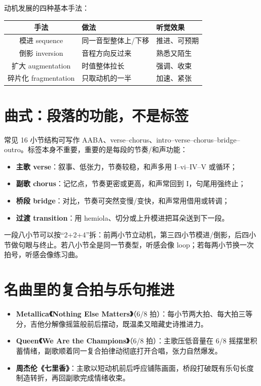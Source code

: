 动机发展的四种基本手法：

\begin{center}
\small
\begin{tabular}{cll}
\toprule
手法 & 做法 & 听觉效果 \\
\midrule
模进 sequence & 同一音型整体上/下移 & 推进、可预期 \\
倒影 inversion & 音程方向反过来 & 熟悉又陌生 \\
扩大 augmentation & 时值整体拉长 & 强调、收束 \\
碎片化 fragmentation & 只取动机的一半 & 加速、紧张 \\
\bottomrule
\end{tabular}
\end{center}

\section{曲式：段落的功能，不是标签}

常见 16 小节结构可写作 AABA、verse--chorus、intro--verse--chorus--bridge--outro。标签本身不重要，重要的是每段的节奏/和声功能：

\begin{itemize}
  \item \textbf{主歌 verse}：叙事、低张力，节奏较稳，和声多用 I--vi--IV--V 或循环；
  \item \textbf{副歌 chorus}：记忆点，节奏更密或更高，和声常回到 I，句尾用强终止；
  \item \textbf{桥段 bridge}：对比，节奏可突然变慢/变快，和声常用借用或转调；
  \item \textbf{过渡 transition}：用 hemiola、切分或上升模进把耳朵送到下一段。
\end{itemize}

一段八小节可以按“2+2+4”拆：前两小节立动机，第三四小节模进/倒影，后四小节做句眼与终止。若八小节全是同一节奏型，听感会像 loop；若每两小节换一次拍号，听感会像练习曲。

\section{名曲里的复合拍与乐句推进}

\begin{itemize}
  \item \textbf{Metallica《Nothing Else Matters》}（6/8 拍）：每小节两大拍、每大拍三等分，吉他分解像摇篮般前后摆动，既温柔又暗藏史诗推进力。
  \item \textbf{Queen《We Are the Champions》}（6/8 拍）：主歌压低音量在 6/8 摇摆里积蓄情绪，副歌顺着同一复合拍律动彻底打开合唱，张力自然爆发。
  \item \textbf{周杰伦《七里香》}：主歌以短动机前后呼应铺陈画面，桥段打破既有乐句长度制造转折，再回副歌完成情绪收束。
\end{itemize}

